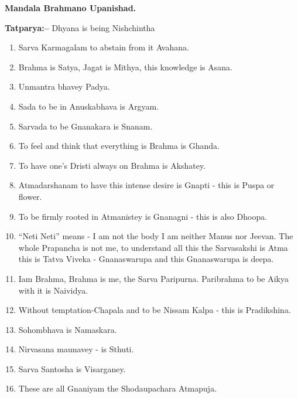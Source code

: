 \begin{flushright}
\textbf{Mandala Brahmano Upanishad.}
\end{flushright}

\textbf{Tatparya:–} Dhyana is being Nishchintha

\begin{enumerate}
\item Sarva Karmagalam to abstain from it Avahana.

 \item Brahma is Satya, Jagat is Mithya, this knowledge is Asana.

 \item Unmantra bhavey Padya.

 \item Sada to be in Anuskabhava is Argyam.

 \item Sarvada to be Gnanakara is Snanam.

 \item To feel and think that everything is Brahma is Ghanda.

 \item To have one's Dristi always on Brahma is Akshatey.

 \item Atmadarshanam to have this intense desire is Gnapti - this is Puspa or flower.

 \item To be firmly rooted in Atmanistey is Gnanagni - this is also Dhoopa.

 \item “Neti Neti” means - I am not the body I am neither Manus nor Jeevan. The whole Prapancha is not me, to understand all this the Sarvasakshi is Atma this is Tatva Viveka - Gnanaswarupa and this Gnanaswarupa is deepa.

 \item Iam Brahma, Brahma is me, the Sarva Paripurna. Paribrahma to be Aikya with it is Naividya.

 \item Without temptation-Chapala and to be Nissam Kalpa - this is Pradikshina.

 \item Sohombhava is Namaskara.

 \item Nirvasana maunavey - is Sthuti.

 \item Sarva Santosha is Visarganey.

 \item These are all Gnaniyam the Shodaupachara Atmapuja.

\end{enumerate}


